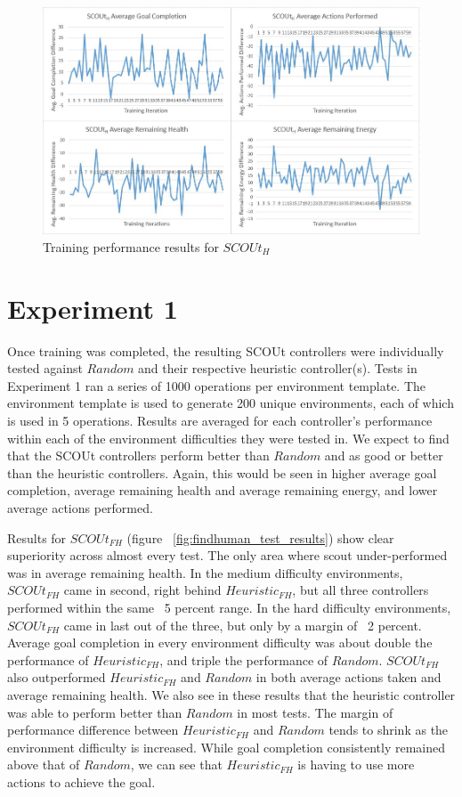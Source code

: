 \begin{figure}[h]
  \includegraphics[width=1.0\columnwidth]{Figures/Results/Training/SCOUt-Hybrid.JPG}
  \caption{Training performance results for $SCOUt_{H}$}
  \label{fig:hybrid_training_results}
\end{figure}



\section{Experiment 1} \label{sec:experiment1}
Once training was completed, the resulting SCOUt controllers were individually tested against $Random$ and their respective heuristic controller(s).
Tests in Experiment 1 ran a series of 1000 operations per environment template.
The environment template is used to generate 200 unique environments, each of which is used in 5 operations.
Results are averaged for each controller's performance within each of the environment difficulties they were tested in.
We expect to find that the SCOUt controllers perform better than $Random$ and as good or better than the heuristic controllers.
Again, this would be seen in higher average goal completion, average remaining health and average remaining energy, and lower average actions performed.

Results for $SCOUt_{FH}$ (figure ~\ref{fig:findhuman_test_results}) show clear superiority across almost every test.
The only area where scout under-performed was in average remaining health.
In the medium difficulty environments, $SCOUt_{FH}$ came in second, right behind $Heuristic_{FH}$, but all three controllers performed within the same ~5 percent range.
In the hard difficulty environments, $SCOUt_{FH}$ came in last out of the three, but only by a margin of ~2 percent.
Average goal completion in every environment difficulty was about double the performance of $Heuristic_{FH}$, and triple the performance of $Random$.
$SCOUt_{FH}$ also outperformed $Heuristic_{FH}$ and $Random$ in both average actions taken and average remaining health.
We also see in these results that the heuristic controller was able to perform better than $Random$ in most tests.
The margin of performance difference between $Heuristic_{FH}$ and $Random$ tends to shrink as the environment difficulty is increased.
While goal completion consistently remained above that of $Random$, we can see that $Heuristic_{FH}$ is having to use more actions to achieve the goal.

